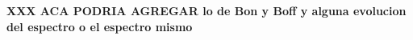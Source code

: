 	
	\textbf{XXX ACA PODRIA AGREGAR lo de Bon y Boff y alguna evolucion del espectro o el espectro mismo}
	
	
	
% 	
% 	
% 	
	
	
	
% 	
% 	
% 	
% 	
% 	
% 	
	

